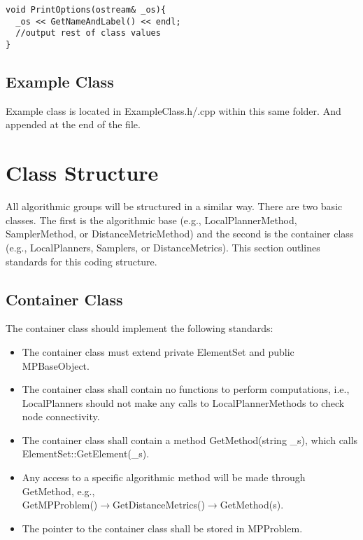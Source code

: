 \documentclass[12pt]{article}
\begin{document}
\begin{lstlisting}
void PrintOptions(ostream& _os){
  _os << GetNameAndLabel() << endl;
  //output rest of class values
}
\end{lstlisting}

\subsection{Example Class}
Example class is located in ExampleClass.h/.cpp within this same folder. And appended at the end of the file.


\section{Class Structure}
All algorithmic groups will be structured in a similar way. There are two basic classes. The first is the algorithmic
base (e.g., LocalPlannerMethod, SamplerMethod, or DistanceMetricMethod) and the second is the container class (e.g.,
LocalPlanners, Samplers, or DistanceMetrics). This section outlines standards for this coding structure.

\subsection{Container Class}
The container class should implement the following standards:

\begin{itemize}
\item The container class must extend private ElementSet and public MPBaseObject.
\item The container class shall contain no functions to perform computations, i.e., LocalPlanners should not make any
calls to LocalPlannerMethods to check node connectivity.
\item The container class shall contain a method GetMethod(string \_s), which calls \\ElementSet::GetElement(\_s).
\item Any access to a specific algorithmic method will be made through GetMethod, e.g., \\
GetMPProblem()$\rightarrow$GetDistanceMetrics()$\rightarrow$GetMethod(s).
\item The pointer to the container class shall be stored in MPProblem.
\end{itemize}
\end{document}
